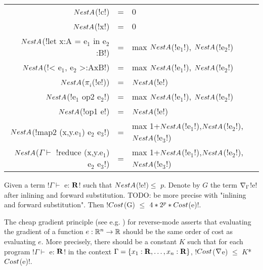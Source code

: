 \begin{tabular}{r c l}
    $NestA$(!c!) &=& 0 \\
    $NestA$(!x!) &=& 0 \\
    $NestA$(!let x:A = e$_1$ in e$_2$:B!) &=& max $NestA$(!e$_1$!), $NestA$(!e$_2$!)  \\ 
    $NestA$(!< e$_1$, e$_2$ >:AxB!) &=& max $NestA$(!e$_1$!), $NestA$(!e$_2$!) \\ 
    $NestA$($\pi_i$(!e!)) &=& $NestA$(!e!)\\
    $NestA$(!e$_1$ op2 e$_2$!) &=& max $NestA$(!e$_1$!), $NestA$(!e$_2$!)\\
    $NestA$(!op1 e!) &=& $NestA$(!e!) \\
    $NestA$(!map2 (x,y.e$_1$) e$_2$ e$_3$!) &=& max 1+$NestA$(!e$_1$!),$NestA$(!e$_2$!),$NestA$(!e$_3$!) \\
    $NestA$($\Gamma\vdash $ !reduce (x,y.e$_1$) e$_2$ e$_3$!) &=& max 1+$NestA$(!e$_1$!),$NestA$(!e$_2$!),$NestA$(!e$_3$!) \\
\end{tabular}

\begin{theorem}
    \label{thm:complexity}
    Given a term !$\Gamma \vdash$ e: $\mathbf{R}$! such that $NestA$(!e!)$\leq$ $p$.
    Denote by $G$ the term $\nabla_\Gamma$!e! after inlining and forward substitution.
    TODO: be more precise with "inlining and forward substitution".
    Then !$Cost$(G) $\leq$ $4*2^{p}*Cost$(e)!.
\end{theorem}

The cheap gradient principle (see e.g. \cite{griewank2008evaluating}) for reverse-mode
asserts that evaluating the gradient of a function $e:\mathbb{R}^n\to\mathbb{R}$ 
should be the same order of cost as evaluating $e$. 
More precisely, there should be a constant $K$ such that for each program !$\Gamma \vdash$ e: $\mathbf{R}$! in the context $\Gamma=\{x_1:\mathbf{R},\ldots,x_n:\mathbf{R}\}$,
 !$Cost$($\nabla$e) $\leq$ $K$*$Cost$(e)!.

